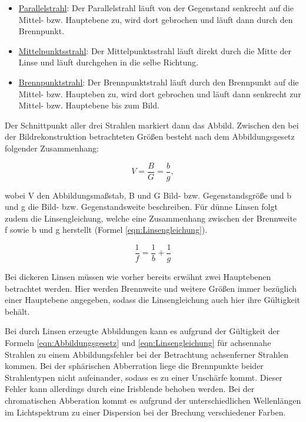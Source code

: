 \begin{itemize}
  \item \underline{Parallelstrahl}: Der Parallelstrahl läuft von der Gegenstand
  senkrecht auf die Mittel- bzw. Hauptebene zu, wird dort gebrochen und läuft
  dann durch den Brennpunkt.
  \item \underline{Mittelpunktsstrahl}: Der Mittelpunktsstrahl läuft direkt durch
  die Mitte der Linse und läuft durchgehen in die selbe Richtung.
  \item \underline{Brennpunktstrahl}: Der Brennpunktstrahl läuft durch den Brennpunkt
  auf die Mittel- bzw.  Haupteben zu, wird dort gebrochen und läuft dann senkrecht
  zur Mittel- bzw. Hauptebene bis zum Bild.
\end{itemize}

Der Schnittpunkt aller drei Strahlen markiert dann das Abbild. Zwischen den bei der
Bildrekonstruktion betrachteten Größen besteht nach dem Abbildungsgesetz folgender
Zusammenhang:

\begin{equation}
  V = \frac{B}{G} = \frac{b}{g},
  \label{eqn:Abbildungsgesetz}
\end{equation}

wobei V den Abbildungsmaßstab, B und G Bild- bzw. Gegenstandsgröße und b und g die
Bild- bzw. Gegenstandsweite beschreiben. Für dünne Linsen folgt zudem die Linsengleichung,
welche eine Zusammenhang zwischen der Brennweite f sowie b und g herstellt (Formel
\eqref{eqn:Linsengleichung}).

\begin{equation}
\frac{1}{f} = \frac{1}{b} + \frac{1}{g}
\label{eqn:Linsengleichung}
\end{equation}

Bei dickeren Linsen müssen wie vorher bereits erwähnt zwei Hauptebenen betrachtet
werden. Hier werden Brennweite und weitere Größen immer bezüglich einer Hauptebene
angegeben, sodass die Linsengleichung auch hier ihre Gültigkeit behält.

Bei durch Linsen erzeugte Abbildungen kann es aufgrund der Gültigkeit der Formeln
\eqref{eqn:Abbildungsgesetz} und \eqref{eqn:Linsengleichung} für achsennahe Strahlen
zu einem Abbildungsfehler bei der Betrachtung achsenferner Strahlen kommen.
Bei der sphärischen Abberration liege die Brennpunkte beider Strahlentypen nicht
aufeinander, sodass es zu einer Unschärfe kommt. Dieser Fehler kann allerdings
durch eine Irisblende behoben werden. Bei der chromatischen Abberation kommt es
aufgrund der unterschiedlichen Wellenlängen im Lichtspektrum zu einer Dispersion
bei der Brechung verschiedener Farben.

